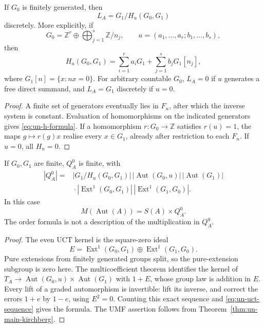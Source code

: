 \begin{proposition}[Computing \(L_A\)]\label{prop:un-l-computation}
If \(G_0\) is finitely generated, then
\[
 L_A=G_1/H_u(G_0,G_1)
\]
discretely. More explicitly, if
\[
 G_0=\mathbb Z^r\oplus\bigoplus_{j=1}^s\mathbb Z/n_j,\qquad
 u=(a_1,\ldots,a_r;b_1,\ldots,b_s),
\]
then
\begin{equation}\label{eq:un-h-formula}
 H_u(G_0,G_1)=\sum_{i=1}^r a_iG_1+
             \sum_{j=1}^s b_jG_1[n_j],
\end{equation}
where \(G_1[n]=\{x:nx=0\}\).
For arbitrary countable \(G_0\), \(L_A=0\) if \(u\) generates
a free direct summand, and \(L_A=G_1\) discretely if \(u=0\).
\end{proposition}
\begin{proof}
A finite set of generators eventually lies in \(F_n\), after which
the inverse system is constant. Evaluation of homomorphisms on
the indicated generators gives \eqref{eq:un-h-formula}.
If a homomorphism \(r:G_0\to\mathbb Z\) satisfies \(r(u)=1\), the maps
\(g\mapsto r(g)x\) realise every \(x\in G_1\), already after
restriction to each \(F_n\). If \(u=0\), all \(H_n=0\).
\end{proof}

\begin{proposition}\label{prop:un-finite-k}
If \(G_0,G_1\) are finite, \(Q_A^0\) is finite, with
\[
 \begin{split}
 |Q_A^0|={}&|G_1/H_u(G_0,G_1)|\,
 |\operatorname{Aut}(G_0,u)|\,|\operatorname{Aut}(G_1)|\\
 &{}\cdot|\operatorname{Ext}^1(G_0,G_1)|\,|\operatorname{Ext}^1(G_1,G_0)|.
 \end{split}
\]
In this case
\[
 M(\operatorname{Aut}(A))=S(A)\times Q_A^0.
\]
The order formula is not a description of the multiplication in \(Q_A^0\).
\end{proposition}
\begin{proof}
The even UCT kernel is the square-zero ideal
\[
 E=\operatorname{Ext}^1(G_0,G_1)\oplus\operatorname{Ext}^1(G_1,G_0).
\]
Pure extensions from finitely generated groups split, so the
pure-extension subgroup is zero here. The multicoefficient theorem
\cite{DadarlatLoring1996,Dadarlat2005} identifies the kernel of
\(T_A\to\operatorname{Aut}(G_0,u)\times\operatorname{Aut}(G_1)\) with \(1+E\), whose group
law is addition in \(E\).
Every lift of a graded automorphism is invertible: lift its inverse,
and correct the errors \(1+e\) by \(1-e\), using \(E^2=0\).
Counting this exact sequence and \eqref{eq:un-uct-sequence} gives
the formula. The UMF assertion follows from Theorem~\ref{thm:un-main-kirchberg}.
\end{proof}

